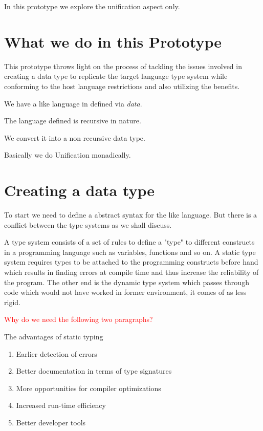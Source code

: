 \documentclass[thesis-solanki.tex]{subfiles}
\begin{document}
In this prototype we explore the unification aspect only.

\section{What we do in this Prototype}
This prototype throws light on the process of tackling the issues involved in creating 
a data type to replicate the target language type system while conforming to the host language restrictions and also utilizing the 
benefits. 


We have a  like language in  defined via \textit{data}.

The language defined is recursive in nature. 

We convert it into a non recursive data type.


Basically we do Unification monadically.


\section{Creating a data type}

To start we need to define a abstract syntax for the  like language. But there is a conflict between the type systems as 
we shall discuss.


A type system consists of a set of rules to define a "type" to different constructs in a programming language such as variables, functions 
and so on. A static type system requires types to be attached to the programming constructs before hand which results in finding errors at 
compile time and thus increase the reliability of the program. The other end is the dynamic type system which passes through code which 
would not have worked in former environment, it comes of as less rigid.

\textcolor{red}{Why do we need the following two paragraphs?}

The advantages of static typing \cite{meijer2004static}
\begin{enumerate}
\item Earlier detection of errors
\item Better documentation in terms of type signatures
\item More opportunities for compiler optimizations
\item Increased run-time efficiency
\item Better developer tools 
\end{enumerate}          
\end{document}
